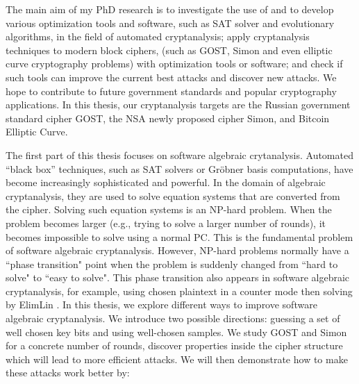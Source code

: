 The main aim of my PhD research is to investigate the use of and to develop various optimization tools and software, such as SAT solver and evolutionary algorithms, in the field of automated cryptanalysis; apply cryptanalysis techniques to modern block ciphers, (such as GOST\cite{gost198928147}, Simon \cite{NSAciphers} and even elliptic curve cryptography problems) with optimization tools or software; and check if such tools can improve the current best attacks and discover new attacks. We hope to contribute to future government standards and popular cryptography applications. In this thesis, our cryptanalysis targets are the Russian government standard cipher GOST, the NSA newly proposed cipher Simon, and Bitcoin Elliptic Curve.

The first part of this thesis focuses on software algebraic crytanalysis. Automated “black box” techniques, such as SAT solvers or Gr\"{o}bner basis computations, have become increasingly sophisticated and powerful. In the domain of algebraic cryptanalysis, they are used to solve equation systems that are converted from the cipher. Solving such equation systems is an NP-hard problem. When the problem becomes larger (e.g., trying to solve a larger number%
 of rounds), it becomes impossible to solve using a normal PC. This is the fundamental problem of software algebraic cryptanalysis. However, NP-hard problems normally have a ``phase transition" point when the problem is suddenly changed from ``hard to solve" to ``easy to solve". This phase transition also appears in software algebraic cryptanalysis, for example, using chosen plaintext in a counter mode then solving by ElimLin \cite{ElimLinR}. In this thesis, we explore different ways to improve software algebraic cryptanalysis. We introduce two possible directions: guessing a set of well chosen key bits and using well-chosen samples. We study GOST and Simon for a concrete number of rounds, discover properties inside the cipher structure which will lead to more efficient attacks. We will then demonstrate how to make these attacks work better by: %

